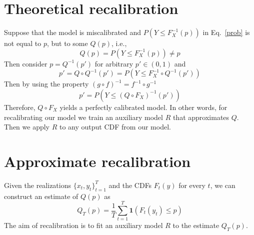 \section{Theoretical recalibration}
Suppose that the model is miscalibrated and $P(Y \leq F_X^{-1}(p))$ in Eq.~\eqref{prob} is not equal to $p$, but to some $Q(p)$, i.e., 
\begin{equation}
	Q(p) = P(Y \leq F_X^{-1}(p)) \neq p
\end{equation}
Then consider $p = Q^{-1}(p')$ for arbitrary $p' \in (0,1)$ and 
\begin{equation}
p' = Q\circ Q^{-1}(p') = P(Y \leq F_X^{-1}\circ Q^{-1}(p') )
\end{equation}
Then by using the property $(g \circ f)^{-1} = f^{-1}\circ g^{-1}$
\begin{equation}
p' = P(Y \leq (Q\circ F_X)^{-1}(p') )
\end{equation}
Therefore, $Q\circ F_X$ yields a perfectly calibrated model. 
In other words, for recalibrating our model we train an auxiliary model $R$ that approximates $Q$.
Then we apply $R$ to any output CDF from our model. 

\section{Approximate recalibration}
Given the realizations $\{x_t, y_t\}_{t=1}^T$ and the CDFs $F_t(y)$ for every $t$, we can construct an estimate of $Q(p)$ as
\begin{equation}
Q_T(p) = \frac{1}{T}\sum_{t=1}^{T}\boldsymbol{1}(F_t(y_t) \leq p)
\end{equation}
The aim of recalibration is to fit an auxiliary model $R$ to the estimate $Q_T(p)$.

